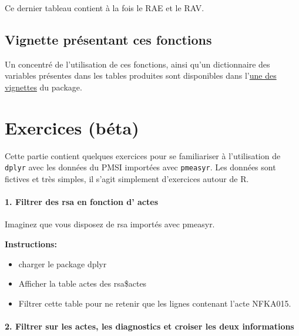 \documentclass[
]{book}
\begin{document}
Ce dernier tableau contient à la fois le RAE et le RAV.

\hypertarget{vignette-pruxe9sentant-ces-fonctions}{%
\section{Vignette présentant ces fonctions}\label{vignette-pruxe9sentant-ces-fonctions}}

Un concentré de l'utilisation de ces fonctions, ainsi qu'un dictionnaire des variables présentes dans les tables produites sont disponibles dans l'\href{https://im-aphp.github.io/pmeasyr/articles/vignette4.html}{une des vignettes} du package.

\hypertarget{exercices-buxe9ta}{%
\chapter{Exercices (béta)}\label{exercices-buxe9ta}}

Cette partie contient quelques exercices pour se familiariser à l'utilisation de \texttt{dplyr} avec les données du PMSI importées avec \texttt{pmeasyr}. Les données sont fictives et très simples, il s'agit simplement d'exercices autour de R.

\hypertarget{filtrer-des-rsa-en-fonction-d-actes}{%
\subsubsection{1. Filtrer des rsa en fonction d' actes}\label{filtrer-des-rsa-en-fonction-d-actes}}

Imaginez que vous disposez de rsa importés avec pmeasyr.

\textbf{Instructions:}

\begin{itemize}
\item
  charger le package dplyr
\item
  Afficher la table actes des rsa\$actes
\item
  Filtrer cette table pour ne retenir que les lignes contenant l'acte NFKA015.
\end{itemize}

\hypertarget{filtrer-sur-les-actes-les-diagnostics-et-croiser-les-deux-informations}{%
\subsubsection{2. Filtrer sur les actes, les diagnostics et croiser les deux informations}\label{filtrer-sur-les-actes-les-diagnostics-et-croiser-les-deux-informations}}
\end{document}
